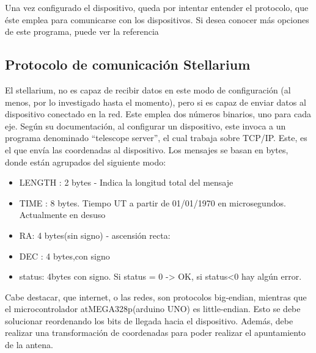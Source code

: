 Una vez configurado el dispositivo, queda por intentar entender el protocolo, que éste emplea para comunicarse con los dispositivos. Si desea conocer más opciones de este programa, puede ver la referencia \cite{stellman}

\subsection{Protocolo de comunicación Stellarium} \label{sub:comun_stell}
El stellarium, no es capaz de recibir datos en este modo de configuración (al menos, por lo investigado hasta el momento), pero si es capaz de enviar datos al dispositivo conectado en la red. Este emplea dos números binarios, uno para cada eje. Según su documentación, al configurar un dispositivo, este invoca a un programa denominado ``telescope server'', el cual trabaja sobre TCP/IP. Este, es el que envía las coordenadas al dispositivo. Los mensajes se basan en bytes, donde están agrupados del siguiente modo: 

\begin{itemize}
	\item LENGTH : 2 bytes - Indica la longitud total del mensaje
	\item TIME : 8 bytes. Tiempo UT a partir de 01/01/1970 en microsegundos. Actualmente en desuso 
	\item RA: 4 bytes(sin signo) - ascensión recta: 
	\item DEC : 4 bytes,con signo
	\item status: 4bytes con signo. Si status = 0 -> OK, si status<0 hay algún error.  
\end{itemize}

Cabe destacar, que internet, o las redes, son protocolos big-endian, mientras que el microcontrolador atMEGA328p(arduino UNO) es little-endian. Esto se debe solucionar reordenando los bits de llegada hacia el dispositivo. Además, debe realizar una transformación de coordenadas para poder realizar el apuntamiento de la antena. 

